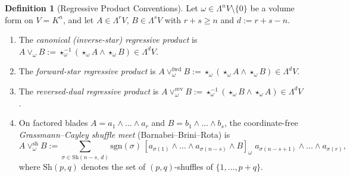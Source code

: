 \documentclass[11pt]{article}
\theoremstyle{definition}
\newtheorem{definition}[theorem]{Definition}
\newcommand{\Sh}{\mathrm{Sh}}
\newcommand{\sgn}{\mathrm{sgn}}
\begin{document}
\begin{definition}[Regressive Product Conventions]\label{def:meet}
Let $\omega \in \Lambda^n V \setminus \{0\}$ be a volume form on $V = K^n$, and let $A \in \Lambda^r V$, $B \in \Lambda^s V$ with $r + s \ge n$ and $d := r + s - n$.
\begin{enumerate}
  \item The \emph{canonical (inverse-star) regressive product} is $A \vee_\omega B := \star_\omega^{-1}(\star_\omega A \wedge \star_\omega B) \in \Lambda^d V$.
  \item The \emph{forward-star regressive product} is $A \vee_\omega^{\mathrm{fwd}} B := \star_\omega(\star_\omega A \wedge \star_\omega B) \in \Lambda^d V$.
  \item The \emph{reversed-dual regressive product} is $A \vee_\omega^{\mathrm{rev}} B := \star_\omega^{-1}(\star_\omega B \wedge \star_\omega A) \in \Lambda^d V$.
  \item On factored blades $A = a_1 \wedge \dots \wedge a_r$ and $B = b_1 \wedge \dots \wedge b_s$, the coordinate-free \emph{Grassmann--Cayley shuffle meet} (Barnabei--Brini--Rota) is
  \begin{equation}\label{eq:shuffle}
    A \vee_\omega^{\mathrm{sh}} B := \sum_{\sigma \in \Sh(n-s,\, d)} \sgn(\sigma)\, [a_{\sigma(1)} \wedge \dots \wedge a_{\sigma(n-s)} \wedge B]_\omega\; a_{\sigma(n-s+1)} \wedge \dots \wedge a_{\sigma(r)},
  \end{equation}
  where $\Sh(p,q)$ denotes the set of $(p,q)$-shuffles of $\{1,\dots,p+q\}$.
\end{enumerate}
\end{definition}
\end{document}
